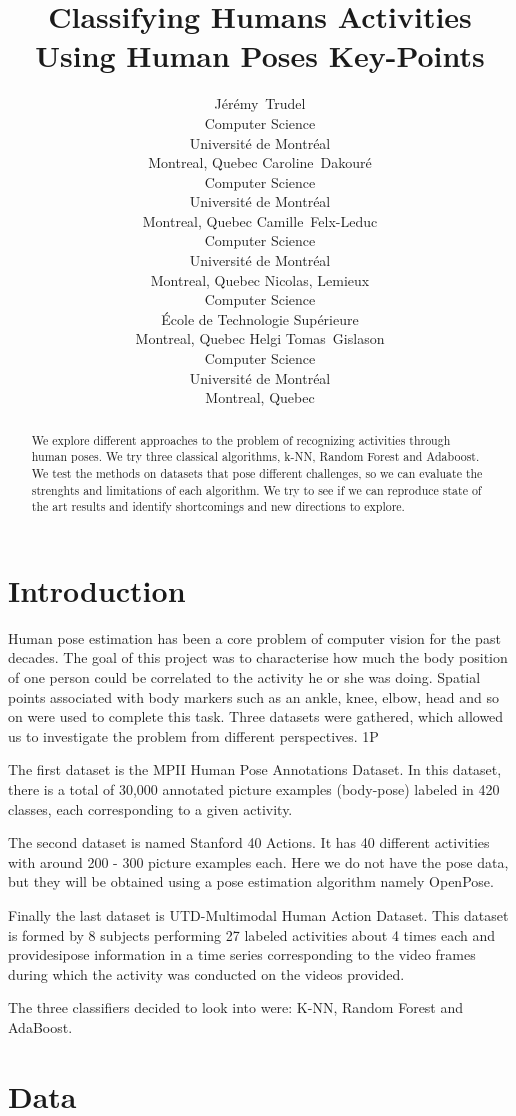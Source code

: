 \documentclass{article}
\title{Classifying Humans Activities Using Human Poses Key-Points}
\author{
Jérémy~Trudel\\
Computer Science\\
Université de Montréal\\
Montreal, Quebec\And
Caroline~Dakouré\\
Computer Science\\
Université de Montréal\\
Montreal, Quebec\And
Camille~Felx-Leduc\\
Computer Science\\
Université de Montréal\\
Montreal, Quebec\And
Nicolas, Lemieux\\
Computer Science\\
École de Technologie Supérieure\\
Montreal, Quebec\And
Helgi Tomas~Gislason\\
Computer Science\\
Université de Montréal\\
Montreal, Quebec
}
\begin{document}

\maketitle

\begin{abstract}
We explore different approaches to the problem of recognizing activities through human poses. We try three classical algorithms, k-NN, Random Forest and Adaboost. We test the methods on datasets that pose different challenges, so we can evaluate the strenghts and limitations of each algorithm.  We try to see if we can reproduce state of the art results and identify shortcomings and new directions to explore.
\end{abstract}

\section{Introduction}
Human pose estimation has been a core problem of computer vision for the past decades.
The goal of this project was to characterise how much the body position of one person could be correlated to the activity he or she was doing. Spatial points associated with body markers such as an ankle, knee, elbow, head and so on were used to complete this task. Three datasets were gathered, which allowed us to investigate the problem from different perspectives.
1P

The first dataset is the MPII Human Pose Annotations Dataset. In this dataset, there is a total of 30,000 annotated picture examples (body-pose) labeled in 420 classes, each corresponding to a given activity.

The second dataset is named Stanford 40 Actions.  It has 40 different activities with around 200 - 300 picture examples each. Here we do not have the pose data, but they will be obtained using a pose estimation algorithm namely OpenPose.

Finally the last dataset is UTD-Multimodal Human Action Dataset.  This dataset is formed by 8 subjects performing 27 labeled activities about 4 times each and providesipose information in a time series corresponding to the video frames during which the activity was conducted on the videos provided.

The three classifiers decided to look into were: K-NN, Random Forest and AdaBoost.

\section{Data}
\end{document}
